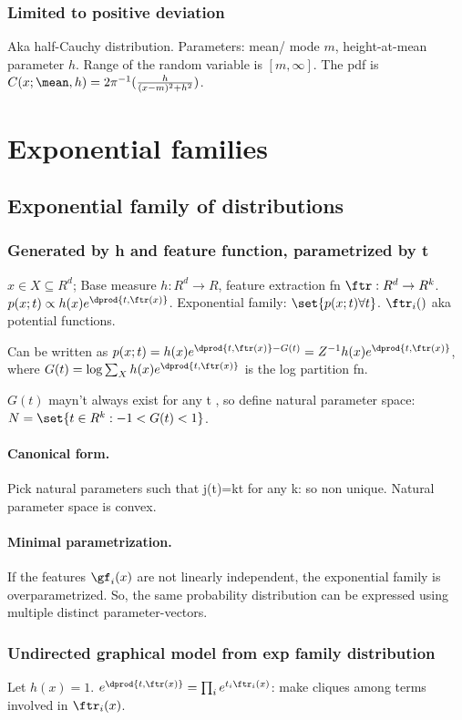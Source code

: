 \documentclass[oneside, article]{memoir}
\begin{document}
\subsection{Limited to positive deviation}
Aka half-Cauchy distribution. Parameters: mean/ mode $m$, height-at-mean parameter $h$. Range of the random variable is $[m, \infty]$. The pdf is $C(x; \mean, h) = 2\pi^{-1} (\frac{h}{(x - m)^{2} + h^{2}})$.

\chapter{Exponential families}
\section{Exponential family of distributions}
\subsection{Generated by h and feature function, parametrized by t}
$x \in X \subseteq R^{d}$; Base measure $h: R^{d} \to R$, feature extraction fn $\ftr: R^{d} \to R^{k}$. $p(x; t) \propto h(x)e^{\dprod{t,\ftr(x)}} $. Exponential family: $\set{p(x; t) \forall t}$. $\ftr_i()$ aka potential functions.

Can be written as $p(x; t) = h(x)e^{\dprod{t,\ftr(x)} - G(t)} = Z^{-1}h(x)e^{\dprod{t,\ftr(x)}}$, where $G(t) = \log \sum_{X}h(x)e^{\dprod{t,\ftr(x)}}$ is the log partition fn.

$G(t)$ mayn't always exist for any t \why, so define natural parameter space: $N = \set{t \in R^{k}: -1 < G(t) < 1}$.

\subsubsection{Canonical form.}
Pick natural parameters such that j(t)=kt for any k: so non unique. Natural parameter space is convex. \why

\subsubsection{Minimal parametrization.}
If the features $\gf_i(x)$ are not linearly independent, the exponential family is overparametrized. So, the same probability distribution can be expressed using multiple distinct parameter-vectors. 

\subsection{Undirected graphical model from exp family distribution}
Let $h(x) = 1$. $e^{\dprod{t,\ftr(x)}} = \prod_i e^{t_i \ftr_i(x)}$: make cliques among terms involved in $\ftr_i(x)$.
\end{document}
